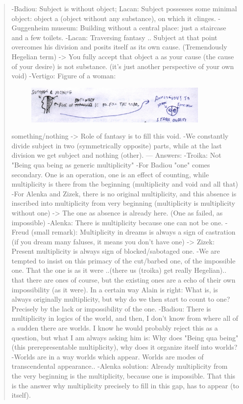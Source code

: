\documentclass{book}
\begin{document}
\begin{quotation}
-Badiou: Subject is without object; Lacan: Subject possesses some minimal object: object a (object without any substance), on which it clinges.
-Guggenheim museum: Building without a central place: just a staircase and a few toilets.
-Lacan: Traversing fantasy .. Subject at that point overcomes his division and posits itself as its own cause. (Tremendously Hegelian term) -> You fully accept that object a as your cause (the cause of your desire) is not substance. (it's just another perspective of your own void)
-Vertigo: Figure of a woman:
\begin{figure}[ht!]
\centering
\includegraphics[width=90mm]{scan14.jpg}
\label{overflow}
\end{figure}
 something/nothing -> Role of fantasy is to fill this void.
-We constantly divide subject in two (symmetrically opposite) parts, while at the last division we get subject and nothing (other).
---
Answers:
-Troika: Not "Being qua being as generic multiplicity"
-For Badiou "one" comes secondary. One is an operation, one is an effect of counting, while multiplicity is there from the beginning (multiplicity and void and all that)
-For Alenka and Zizek, there is no original multiplicity, and this absence is inscribed into multiplicity from very beginning (multiplicity is multiplicity without one) -> The one as absence is already here. (One as failed, as impossible)
-Alenka: There is multiplicity because one can not be one.
-Freud (small remark): Multiplicity in dreams is always a sign of castration (if you dream many faluses, it means you don't have one) -> Zizek: Present multiplicity is always sign of blocked/sabotaged one.
-We are tempted to insist on this primacy of the cut/barbed one, of the impossible one. That the one is as it were ..(there us (troika) get really Hegelian).. that there are ones of course, but the existing ones are a echo of their own impossibility (as it were). In a certain way Alain is right: What is, is always originally multiplicity, but why do we then start to count to one? Precisely by the lack or impossibility of the one.
-Badiou: There is multiplicity in logics of the world, and then, I don't know from where all of a sudden there are worlds. I know he would probably reject this as a question, but what I am always asking him is: Why does "Being qua being" (this prerepresentable multiplicity), why does it organize itself into worlds? -Worlds are in a way worlds which appear. Worlds are modes of transcendental appearance.. -Alenka solution: Already multiplicity from the very beginning is the multiplicity, because one is impossible. That this is the answer why multiplicity precisely to fill in this gap, has to appear (to itself).

\end{quotation}
\end{document}
